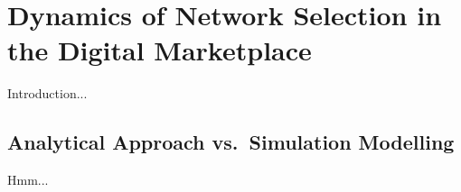 \chapter{Dynamics of Network Selection in the Digital Marketplace} %
\label{cha:dynamics_of_network_selection_in_the_digital_marketplace}

\minitoc
\vspace{10mm}

Introduction...

\section{Analytical Approach vs.~Simulation Modelling} %
\label{sec:analytical_approach_vs_simulation_modelling}
Hmm...

